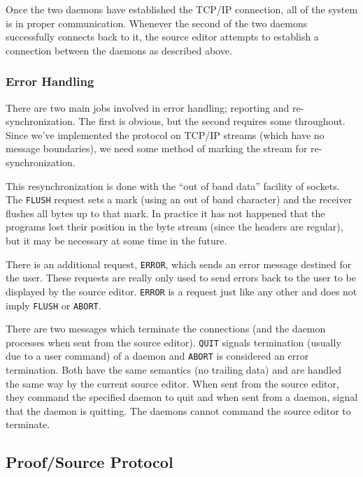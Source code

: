 Once the two daemons have established the TCP/IP connection, all of the
system is in proper communication.  Whenever the second of the two daemons
successfully connects back to it, the source editor attempts to establish
a connection between the daemons as described above.

\subsubsection{Error Handling}

There are two main jobs involved in error handling; reporting and
re-synchronization.  The first is obvious, but the second requires
some throughout.  Since we've implemented the {\VorTeX} protocol on
TCP/IP streams (which have no message boundaries), we need some method
of marking the stream for re-synchronization.

This resynchronization is done with the ``out of band data'' facility
of {\UNIX} sockets.  The {\tt FLUSH} request sets a mark (using an
out of band character) and the receiver flushes all bytes up to that
mark.  In practice it has not happened that the programs lost their
position in the byte stream (since the headers are regular), but it
may be necessary at some time in the future.

There is an additional request, {\tt ERROR}, which sends an {\ASCII}
error message destined for the user.  These requests are really only
used to send errors back to the user to be displayed by the source
editor.  {\tt ERROR} is a request just like any other and does not
imply {\tt FLUSH} or {\tt ABORT}.

There are two messages which terminate the connections (and the daemon
processes when sent from the source editor).  {\tt QUIT} signals
termination (usually due to a user command) of a daemon and {\tt ABORT}
is considered an error termination.  Both have the same semantics
(no trailing data) and are handled the same way by the current source
editor.  When sent from the source editor, they command the specified
daemon to quit and when sent from a daemon, signal that the daemon is
quitting.  The daemons cannot command the source editor to terminate.

\subsection{Proof/Source Protocol}

